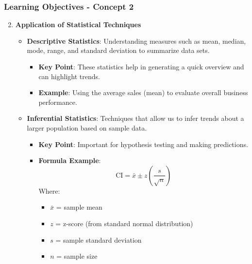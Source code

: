 \documentclass[aspectratio=169]{beamer}
\begin{document}
\begin{frame}[fragile]
    \frametitle{Learning Objectives - Concept 2}
    \begin{enumerate}
        \setcounter{enumi}{1} %
        \item \textbf{Application of Statistical Techniques}
        \begin{itemize}
            \item \textbf{Descriptive Statistics}: Understanding measures such as mean, median, mode, range, and standard deviation to summarize data sets.
            \begin{itemize}
                \item \textbf{Key Point}: These statistics help in generating a quick overview and can highlight trends.
                \item \textbf{Example}: Using the average sales (mean) to evaluate overall business performance.
            \end{itemize}
            \item \textbf{Inferential Statistics}: Techniques that allow us to infer trends about a larger population based on sample data.
            \begin{itemize}
                \item \textbf{Key Point}: Important for hypothesis testing and making predictions.
                \item \textbf{Formula Example}:
                \begin{equation}
                    \text{CI} = \bar{x} \pm z \left( \frac{s}{\sqrt{n}} \right)
                \end{equation}
                Where:
                \begin{itemize}
                    \item \( \bar{x} \) = sample mean
                    \item \( z \) = z-score (from standard normal distribution)
                    \item \( s \) = sample standard deviation
                    \item \( n \) = sample size
                \end{itemize}
            \end{itemize}
        \end{itemize}
    \end{enumerate}
\end{frame}
\end{document}
